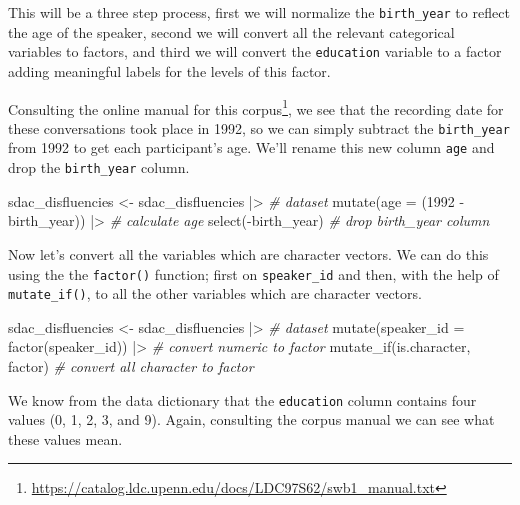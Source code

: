 \documentclass[
  letterpaper,
]{scrbook}
\newenvironment{Shaded}{\begin{snugshade}}{\end{snugshade}}
\newcommand{\AttributeTok}[1]{\textcolor[rgb]{0.00,0.00,0.00}{#1}}
\newcommand{\CommentTok}[1]{\textcolor[rgb]{0.00,0.00,0.00}{\textit{#1}}}
\newcommand{\DecValTok}[1]{\textcolor[rgb]{0.00,0.00,0.00}{#1}}
\newcommand{\FunctionTok}[1]{\textcolor[rgb]{0.00,0.00,0.00}{#1}}
\newcommand{\NormalTok}[1]{\textcolor[rgb]{0.00,0.00,0.00}{#1}}
\newcommand{\OtherTok}[1]{\textcolor[rgb]{0.00,0.00,0.00}{#1}}
\newcommand{\SpecialCharTok}[1]{\textcolor[rgb]{0.00,0.00,0.00}{#1}}
\DeclareRobustCommand{\href}[2]{#2\footnote{\url{#1}}}
\begin{document}
This will be a three step process, first we will normalize the
\texttt{birth\_year} to reflect the age of the speaker, second we will
convert all the relevant categorical variables to factors, and third we
will convert the \texttt{education} variable to a factor adding
meaningful labels for the levels of this factor.

Consulting the
\href{https://catalog.ldc.upenn.edu/docs/LDC97S62/swb1_manual.txt}{online
manual for this corpus}, we see that the recording date for these
conversations took place in 1992, so we can simply subtract the
\texttt{birth\_year} from 1992 to get each participant's age. We'll
rename this new column \texttt{age} and drop the \texttt{birth\_year}
column.

\begin{Shaded}
\begin{Highlighting}[]
\NormalTok{sdac\_disfluencies }\OtherTok{\textless{}{-}} 
\NormalTok{  sdac\_disfluencies }\SpecialCharTok{|\textgreater{}} \CommentTok{\# dataset}
  \FunctionTok{mutate}\NormalTok{(}\AttributeTok{age =}\NormalTok{ (}\DecValTok{1992} \SpecialCharTok{{-}}\NormalTok{ birth\_year)) }\SpecialCharTok{|\textgreater{}} \CommentTok{\# calculate age}
  \FunctionTok{select}\NormalTok{(}\SpecialCharTok{{-}}\NormalTok{birth\_year) }\CommentTok{\# drop \textasciigrave{}birth\_year\textasciigrave{} column}
\end{Highlighting}
\end{Shaded}

Now let's convert all the variables which are character vectors. We can
do this using the the \texttt{factor()} function; first on
\texttt{speaker\_id} and then, with the help of \texttt{mutate\_if()},
to all the other variables which are character vectors.

\begin{Shaded}
\begin{Highlighting}[]
\NormalTok{sdac\_disfluencies }\OtherTok{\textless{}{-}} 
\NormalTok{  sdac\_disfluencies }\SpecialCharTok{|\textgreater{}} \CommentTok{\# dataset}
  \FunctionTok{mutate}\NormalTok{(}\AttributeTok{speaker\_id =} \FunctionTok{factor}\NormalTok{(speaker\_id)) }\SpecialCharTok{|\textgreater{}} \CommentTok{\# convert numeric to factor}
  \FunctionTok{mutate\_if}\NormalTok{(is.character, factor) }\CommentTok{\# convert all character to factor}
\end{Highlighting}
\end{Shaded}

We know from the data dictionary that the \texttt{education} column
contains four values (0, 1, 2, 3, and 9). Again, consulting the corpus
manual we can see what these values mean.
\end{document}
